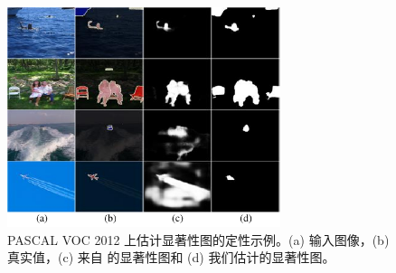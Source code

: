 \begin{figure}[t]
\centering
\includegraphics[width=8cm]{figures/fig_saliency_v2.pdf}
\caption{PASCAL VOC 2012 上估计显著性图的定性示例。(a) 输入图像，(b) 真实值，(c) 来自 \cite{zhao2019pyramid} 的显著性图和 (d) 我们估计的显著性图。} \vspace{-2mm}
\label{fig:sal}
\end{figure}

